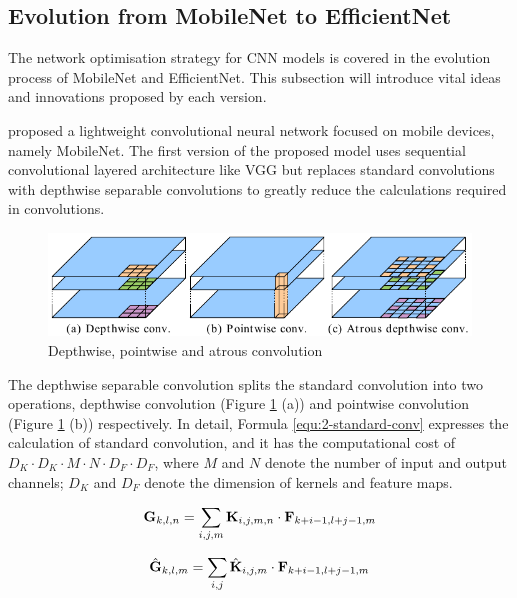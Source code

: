 \subsection{Evolution from MobileNet to EfficientNet}
The network optimisation strategy for CNN models is covered in the evolution process of MobileNet and EfficientNet. This subsection will introduce vital ideas and innovations proposed by each version.

\citet{howard2017mobilenets} proposed a lightweight convolutional neural network focused on mobile devices, namely MobileNet.
The first version of the proposed model uses sequential convolutional layered architecture like VGG but replaces standard convolutions with depthwise separable convolutions to greatly reduce the calculations required in convolutions.

\begin{figure}[!ht]
    \centering
    \includegraphics[width=.8\textwidth]{literature/imgs/ext-2-mobile-depth-point-atrous.pdf}
    \caption{Depthwise, pointwise and atrous convolution \cite{chen2018encoder}}
    \label{fig:ext-2-mobile-depth-point-atrous}
\end{figure}

The depthwise separable convolution splits the standard convolution into two operations, depthwise convolution (Figure \ref{fig:ext-2-mobile-depth-point-atrous} (a)) and pointwise convolution (Figure \ref{fig:ext-2-mobile-depth-point-atrous} (b)) respectively.
In detail, Formula \ref{equ:2-standard-conv} expresses the calculation of standard convolution, and it has the computational cost of $D_K \cdot D_K \cdot M \cdot N \cdot D_F \cdot D_F$, where $M$ and $N$ denote the number of input and output channels; $D_K$ and $D_F$ denote the dimension of kernels and feature maps.

\begin{minipage}[!ht]{.48\textwidth}
\begin{equation}
    \mathbf{G}_{k, l, n}=\sum_{i, j, m} \mathbf{K}_{i, j, m, n} \cdot \mathbf{F}_{k+i-1, l+j-1, m}
    \eqcite{howard2017mobilenets}
    \label{equ:2-standard-conv}
\end{equation}
\end{minipage}
\begin{minipage}[!ht]{.48\textwidth}
\begin{equation}
    \hat{\mathbf{G}}_{k, l, m}=\sum_{i, j} \hat{\mathbf{K}}_{i, j, m} \cdot \mathbf{F}_{k+i-1, l+j-1, m}
    \eqcite{howard2017mobilenets}
    \label{equ:2-depthwise-conv}
\end{equation}
\end{minipage}


